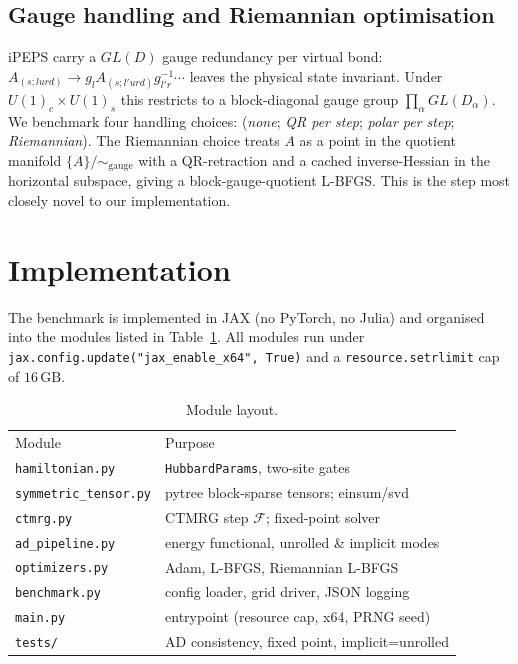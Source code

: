 \documentclass[aps,prb,reprint,amsmath,amssymb,floatfix]{revtex4-2}
\newcommand{\F}{\mathcal{F}}
\begin{document}
\subsection{Gauge handling and Riemannian optimisation}

iPEPS carry a $GL(D)$ gauge redundancy per virtual bond: $A_{(s;lurd)}\to g_l A_{(s;l'urd)}g^{-1}_{l'r}\cdots$ leaves the physical state invariant. Under $U(1)_c\!\times\!U(1)_s$ this restricts to a block-diagonal gauge group $\prod_\alpha GL(D_\alpha)$. We benchmark four handling choices: (\emph{none}; \emph{QR per step}; \emph{polar per step}; \emph{Riemannian}). The Riemannian choice treats $A$ as a point in the quotient manifold $\{A\}/\!\sim_{\text{gauge}}$ with a QR-retraction and a cached inverse-Hessian in the horizontal subspace, giving a block-gauge-quotient L-BFGS. This is the step most closely novel to our implementation.

\section{Implementation}
\label{sec:impl}

The benchmark is implemented in JAX (no PyTorch, no Julia) and organised into the modules listed in Table~\ref{tab:modules}. All modules run under \verb|jax.config.update("jax_enable_x64", True)| and a \verb|resource.setrlimit| cap of $16\,\mathrm{GB}$.

\begin{table}[ht]
\caption{Module layout.}
\label{tab:modules}
\begin{ruledtabular}
\begin{tabular}{ll}
Module & Purpose \\
\colrule
\texttt{hamiltonian.py}     & \texttt{HubbardParams}, two-site gates \\
\texttt{symmetric\_tensor.py} & pytree block-sparse tensors; einsum/svd \\
\texttt{ctmrg.py}           & CTMRG step $\F$; fixed-point solver \\
\texttt{ad\_pipeline.py}    & energy functional, unrolled \& implicit modes \\
\texttt{optimizers.py}      & Adam, L-BFGS, Riemannian L-BFGS \\
\texttt{benchmark.py}       & config loader, grid driver, JSON logging \\
\texttt{main.py}            & entrypoint (resource cap, x64, PRNG seed) \\
\texttt{tests/}             & AD consistency, fixed point, implicit=unrolled \\
\end{tabular}
\end{ruledtabular}
\end{table}
\end{document}
